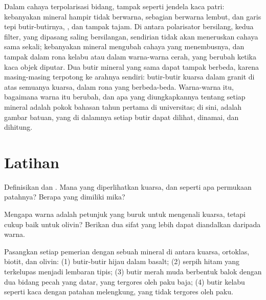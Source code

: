 Dalam cahaya terpolarisasi bidang,  tampak seperti jendela kaca
patri: kebanyakan mineral hampir tidak berwarna, sebagian berwarna lembut, dan
garis tepi butir-butirnya, , dan  tampak tajam. Di antara
polarisator bersilang, kedua filter, yang dipasang saling bersilangan, sendirian
tidak akan meneruskan cahaya sama sekali; kebanyakan mineral mengubah cahaya yang
menembusnya, dan tampak dalam rona kelabu atau dalam warna-warna cerah, yang
berubah ketika kaca objek diputar. Dua butir mineral yang sama dapat tampak
berbeda, karena masing-masing terpotong ke arahnya sendiri: butir-butir kuarsa
dalam granit di atas semuanya kuarsa, dalam rona yang berbeda-beda. Warna-warna
itu, bagaimana warna itu berubah, dan apa yang diungkapkannya tentang setiap
mineral adalah pokok bahasan tahun pertama di universitas; di sini, 
adalah gambar batuan, yang di dalamnya setiap butir dapat dilihat, dinamai, dan
dihitung.

\section{Latihan}

\begin{exercise}[$\star$]\label{exo:g11:minerals:1}
Definisikan  dan . Mana yang diperlihatkan kuarsa, dan seperti apa
permukaan patahnya? Berapa  yang dimiliki mika?
\end{exercise}

\begin{exercise}[$\star$]\label{exo:g11:minerals:2}
Mengapa warna adalah petunjuk yang buruk untuk mengenali kuarsa, tetapi cukup baik
untuk olivin? Berikan dua sifat yang lebih dapat diandalkan daripada warna.
\end{exercise}

\begin{exercise}[$\star$]\label{exo:g11:minerals:3}
Pasangkan setiap pemerian dengan sebuah mineral di antara kuarsa, ortoklas,
biotit, dan olivin: (1) butir-butir hijau dalam basalt; (2) serpih hitam yang
terkelupas menjadi lembaran tipis; (3) butir merah muda berbentuk balok dengan dua
bidang pecah yang datar, yang tergores oleh paku baja; (4) butir kelabu seperti
kaca dengan patahan melengkung, yang tidak tergores oleh paku.
\end{exercise}


